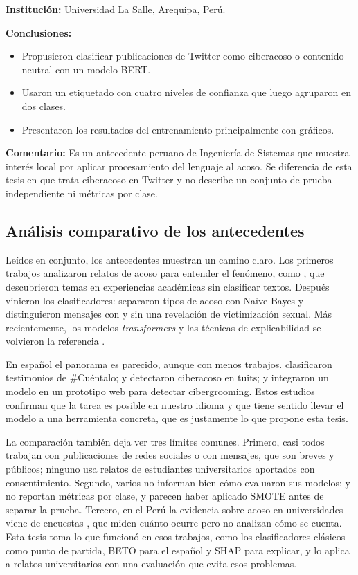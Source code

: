 \noindent\textbf{Institución:} Universidad La Salle, Arequipa, Perú.

\noindent\textbf{Conclusiones:}
\begin{itemize}
	\item Propusieron clasificar publicaciones de Twitter como ciberacoso o contenido neutral con un modelo BERT.
	\item Usaron un etiquetado con cuatro niveles de confianza que luego agruparon en dos clases.
	\item Presentaron los resultados del entrenamiento principalmente con gráficos.
\end{itemize}

\noindent\textbf{Comentario:} Es un antecedente peruano de Ingeniería de Sistemas que muestra interés local por aplicar procesamiento del lenguaje al acoso. Se diferencia de esta tesis en que trata ciberacoso en Twitter y no describe un conjunto de prueba independiente ni métricas por clase.

\subsection{Análisis comparativo de los antecedentes}
Leídos en conjunto, los antecedentes muestran un camino claro. Los primeros trabajos analizaron relatos de acoso para entender el fenómeno, como \citet{karami2020}, que descubrieron temas en experiencias académicas sin clasificar textos. Después vinieron los clasificadores: \citet{wijaya2022} separaron tipos de acoso con Naïve Bayes y \citet{gorissen2023} distinguieron mensajes con y sin una revelación de victimización sexual. Más recientemente, los modelos \textit{transformers} y las técnicas de explicabilidad se volvieron la referencia \citep{mohammadi2024}.

En español el panorama es parecido, aunque con menos trabajos. \citet{escobar2022} clasificaron testimonios de \#Cuéntalo; \citet{cumba2018} y \citet{aguirre2022} detectaron ciberacoso en tuits; y \citet{imbaquinga2025} integraron un modelo en un prototipo web para detectar cibergrooming. Estos estudios confirman que la tarea es posible en nuestro idioma y que tiene sentido llevar el modelo a una herramienta concreta, que es justamente lo que propone esta tesis.

La comparación también deja ver tres límites comunes. Primero, casi todos trabajan con publicaciones de redes sociales o con mensajes, que son breves y públicos; ninguno usa relatos de estudiantes universitarios aportados con consentimiento. Segundo, varios no informan bien cómo evaluaron sus modelos: \citet{escobar2022} y \citet{aguirre2022} no reportan métricas por clase, y \citet{wijaya2022} parecen haber aplicado SMOTE antes de separar la prueba. Tercero, en el Perú la evidencia sobre acoso en universidades viene de encuestas \citep{gutierrez2022}, que miden cuánto ocurre pero no analizan cómo se cuenta. Esta tesis toma lo que funcionó en esos trabajos, como los clasificadores clásicos como punto de partida, BETO para el español y SHAP para explicar, y lo aplica a relatos universitarios con una evaluación que evita esos problemas.

